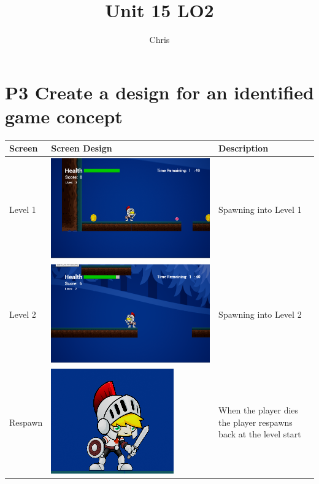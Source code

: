 \documentclass{article}
\title{Unit 15 LO2}
\author{Chris}
\date{}
\begin{document}
\maketitle
\tableofcontents
\break

\section{P3 Create a design for an identified game concept}

\begin{center}
\begin{tabular}{||p{2.5em}|p{10cm}|p{5cm}||}
	\hline
		Screen & Screen Design & Description \\
	\hline
	\hline
		Level 1 & \includegraphics[scale=0.15]{Level1} & Spawning into Level 1 \\
	\hline
		Level 2 & \includegraphics[scale=0.15]{Level2} & Spawning into Level 2 \\ 
	\hline
		Respawn & \includegraphics[scale=1]{Death} & When the player dies the player respawns back at the level start \\

\end{tabular}
\end{center}
\end{document}
